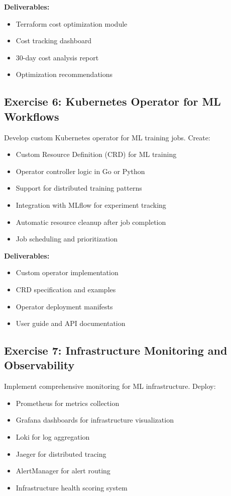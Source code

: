 \textbf{Deliverables:}
\begin{itemize}
    \item Terraform cost optimization module
    \item Cost tracking dashboard
    \item 30-day cost analysis report
    \item Optimization recommendations
\end{itemize}

\subsection{Exercise 6: Kubernetes Operator for ML Workflows}

Develop custom Kubernetes operator for ML training jobs. Create:

\begin{itemize}
    \item Custom Resource Definition (CRD) for ML training
    \item Operator controller logic in Go or Python
    \item Support for distributed training patterns
    \item Integration with MLflow for experiment tracking
    \item Automatic resource cleanup after job completion
    \item Job scheduling and prioritization
\end{itemize}

\textbf{Deliverables:}
\begin{itemize}
    \item Custom operator implementation
    \item CRD specification and examples
    \item Operator deployment manifests
    \item User guide and API documentation
\end{itemize}

\subsection{Exercise 7: Infrastructure Monitoring and Observability}

Implement comprehensive monitoring for ML infrastructure. Deploy:

\begin{itemize}
    \item Prometheus for metrics collection
    \item Grafana dashboards for infrastructure visualization
    \item Loki for log aggregation
    \item Jaeger for distributed tracing
    \item AlertManager for alert routing
    \item Infrastructure health scoring system
\end{itemize}

